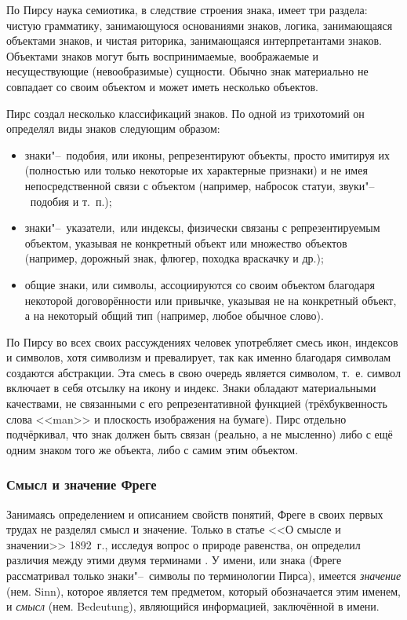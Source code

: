 \documentclass[a4paper,12pt]{article}
\begin{document}
	По Пирсу наука семиотика, в следствие строения знака, имеет три раздела: чистую грамматику, занимающуюся основаниями знаков, логика, занимающаяся объектами знаков, и чистая риторика, занимающаяся интерпретантами знаков. Объектами знаков могут быть воспринимаемые, воображаемые и несуществующие (невообразимые) сущности. Обычно знак материально не совпадает со своим объектом и может иметь несколько объектов.
	
	Пирс создал несколько классификаций знаков. По одной из трихотомий он определял виды знаков следующим образом:
	\begin{itemize}
		\item знаки"--~подобия, или иконы, репрезентируют объекты, просто имитируя их (полностью или только некоторые их характерные признаки) и не имея непосредственной связи с объектом (например, набросок статуи, звуки"--~подобия и т.~п.);
		\item знаки"--~указатели,~или индексы, физически связаны с репрезентируемым объектом, указывая не  конкретный объект или множество объектов (например, дорожный знак, флюгер, походка враскачку и др.);
		\item общие знаки, или символы, ассоциируются со своим объектом благодаря некоторой договорённости или привычке, указывая не на конкретный объект, а на некоторый общий тип (например, любое обычное слово).
	\end{itemize}
	
	По Пирсу во всех своих рассуждениях человек употребляет смесь икон, индексов и символов, хотя символизм и превалирует, так как именно благодаря символам создаются абстракции. Эта смесь в свою очередь является символом, т.~е. символ включает в себя отсылку на икону и индекс. Знаки обладают материальными качествами, не связанными с его репрезентативной функцией (трёхбуквенность слова <<man>> и плоскость изображения на бумаге). Пирс отдельно подчёркивал, что знак должен быть связан (реально, а не мысленно) либо с ещё одним знаком того же объекта, либо с самим этим объектом.
	
	\subsubsection{Смысл и значение Фреге}
	
	Занимаясь определением и описанием свойств понятий, Фреге в своих первых трудах не разделял смысл и значение. Только в статье <<О смысле и значении>> 1892~г., исследуя вопрос о природе равенства, он определил различия между этими двумя терминами \cite{Frege2000, Birukov1960}. У имени, или знака (Фреге рассматривал только знаки"--~символы по терминологии Пирса), имеется \textit{значение} (нем. Sinn), которое является тем предметом, который обозначается этим именем, и \textit{смысл} (нем. Bedeutung), являющийся информацией, заключённой в имени.
	
\end{document}
